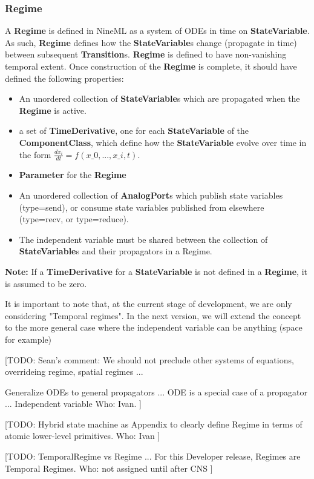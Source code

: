 \documentclass{article}
\newcommand{\note}[1]{%
\begin{center}
\colorbox{issuecolor}{\parbox{0.8\linewidth}{\textbf{Note:} #1}}
\end{center}%
}
\newcommand{\nmlClass}[1]{{\bf #1}}
\newcommand{\ComponentClass}{{\bf{ComponentClass}}\xspace}
\newcommand{\StateVariable}{{\bf{StateVariable}}\xspace}
\newcommand{\StateVariables}{{\bf{StateVariable}}s\xspace}
\newcommand{\TimeDerivative}{{\bf{TimeDerivative}}\xspace}
\newcommand{\Regime}{{\bf{Regime}}\xspace}
\newcommand{\Transitions}{{\bf{Transition}}s\xspace}
\newcommand{\Parameter}{{\bf{Parameter}}\xspace}
\begin{document}
\subsubsection{Regime}

A \nmlClass{Regime} is defined in NineML as a system of ODEs in time
on \StateVariable.  As such, \Regime defines how the \StateVariables change (propagate in time) between subsequent \Transitions. \Regime is defined to have non-vanishing
temporal extent. Once construction of the \Regime is complete, it
should have defined the following properties:

\begin{itemize}
\item An unordered collection of \nmlClass{StateVariable}s which are
propagated when the \nmlClass{Regime} is active.
\item a set of \TimeDerivative, one for each \StateVariable
of the \ComponentClass, which define how the \StateVariable
evolve over time in the form $\frac{dx_{i}}{dt} = f(x\_0, ..., x\_i, t)$.
\item \Parameter for the \nmlClass{Regime}
\item An unordered collection of \nmlClass{AnalogPort}s which publish state
variables (type=send), or consume state variables published from elsewhere
(type=recv, or type=reduce).
\item The independent variable must be shared between the collection
of \StateVariables and their propagators in a Regime.
\end{itemize}

\note{If a \textbf{TimeDerivative} for a \StateVariable is not defined
in a \Regime, it is assumed to be zero.}

It is important to note that, at the current stage of development, we are only considering "Temporal regimes". In the next version, we will extend the concept to the more general case where the independent variable can be anything (space for example)

[TODO:
Sean's comment:
We should not preclude other systems of equations,
overrideing regime, spatial regimes ...

Generalize ODEs to general propagators ...
ODE is a special case of a propagator ...
Independent variable
Who: Ivan.
]

[TODO: Hybrid state machine as Appendix to clearly define Regime
in terms of atomic lower-level primitives.
Who: Ivan
]

[TODO:
TemporalRegime vs Regime ...
For this Developer release, Regimes are Temporal Regimes.
Who: not assigned until after CNS
]
\end{document}
